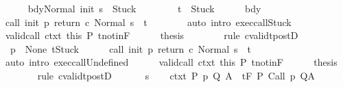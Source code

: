 \begin{isabellebody}
\ \ \ \ \isamarkupfalse%
\ {\isachardoublequoteopen}{\isasymGamma}{\isasymturnstile}{\isasymlangle}bdy{\isacharcomma}Normal\ {\isacharparenleft}init\ s{\isacharparenright}{\isasymrangle}\ {\isasymRightarrow}\ Stuck{\isachardoublequoteclose}\ \ \isanewline
\ \ \ \ \ \ {\isachardoublequoteopen}t\ {\isacharequal}\ Stuck{\isachardoublequoteclose}\isanewline
\ \ \ \ \isamarkupfalse%
\ bdy\ \isamarkupfalse%
\ {\isachardoublequoteopen}{\isasymGamma}{\isasymturnstile}{\isasymlangle}call\ init\ p\ return{\isacharprime}\ c\ {\isacharcomma}Normal\ s{\isasymrangle}\ {\isasymRightarrow}\ t{\isachardoublequoteclose}\isanewline
\ \ \ \ \ \ \isamarkupfalse%
\ {\isacharparenleft}auto\ intro{\isacharcolon}\ exec{\isacharunderscore}callStuck{\isacharparenright}\isanewline
\ \ \ \ \isamarkupfalse%
\ valid{\isacharunderscore}call\ ctxt\ this\ P\ t{\isacharunderscore}notin{\isacharunderscore}F\isanewline
\ \ \ \ \isamarkupfalse%
\ {\isacharquery}thesis\isanewline
\ \ \ \ \ \ \isamarkupfalse%
\ {\isacharparenleft}rule\ cvalidt{\isacharunderscore}postD{\isacharparenright}\isanewline
\ \ \isamarkupfalse%
\isanewline
\ \ \ \ \isamarkupfalse%
\ {\isachardoublequoteopen}{\isasymGamma}\ p\ {\isacharequal}\ None{\isachardoublequoteclose}\ {\isachardoublequoteopen}t{\isacharequal}Stuck{\isachardoublequoteclose}\isanewline
\ \ \ \ \isamarkupfalse%
\ {\isachardoublequoteopen}{\isasymGamma}{\isasymturnstile}{\isasymlangle}call\ init\ p\ return{\isacharprime}\ c\ {\isacharcomma}Normal\ s{\isasymrangle}\ {\isasymRightarrow}\ t{\isachardoublequoteclose}\isanewline
\ \ \ \ \ \ \isamarkupfalse%
\ {\isacharparenleft}auto\ intro{\isacharcolon}\ exec{\isacharunderscore}callUndefined{\isacharparenright}\isanewline
\ \ \ \ \isamarkupfalse%
\ valid{\isacharunderscore}call\ ctxt\ this\ P\ t{\isacharunderscore}notin{\isacharunderscore}F\isanewline
\ \ \ \ \isamarkupfalse%
\ {\isacharquery}thesis\isanewline
\ \ \ \ \ \ \isamarkupfalse%
\ {\isacharparenleft}rule\ cvalidt{\isacharunderscore}postD{\isacharparenright}\isanewline
\ \ \isamarkupfalse%
\isanewline
{}\isamarkupfalse%
\isanewline
\ \ \isamarkupfalse%
\ s\isanewline
\ \ \isamarkupfalse%
\ ctxt{\isacharcolon}\ {\isachardoublequoteopen}{\isasymforall}{\isacharparenleft}P{\isacharcomma}\ p{\isacharcomma}\ Q{\isacharcomma}\ A{\isacharparenright}{\isasymin}{\isasymTheta}{\isachardot}\ {\isasymGamma}\ {\isasymTurnstile}\isactrlsub t\isactrlbsub {\isacharslash}F\isactrlesub \ P\ {\isacharparenleft}Call\ p{\isacharparenright}\ Q{\isacharcomma}A{\isachardoublequoteclose}\isanewline

\end{isabellebody}
